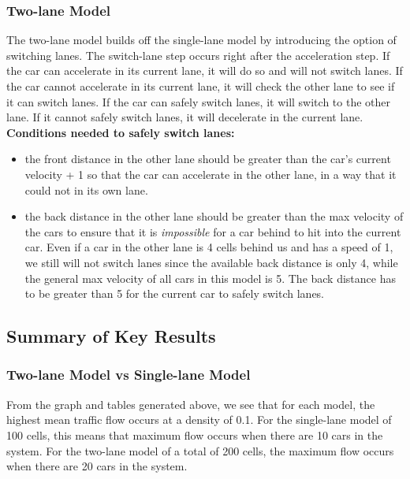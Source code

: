 \documentclass[11pt]{article}
\begin{document}
\subsubsection{Two-lane Model}

The two-lane model builds off the single-lane model by introducing the
option of switching lanes. The switch-lane step occurs right after the
acceleration step. If the car can accelerate in its current lane, it
will do so and will not switch lanes. If the car cannot accelerate in
its current lane, it will check the other lane to see if it can switch
lanes. If the car can safely switch lanes, it will switch to the other
lane. If it cannot safely switch lanes, it will decelerate in the
current lane.\\

\textbf{Conditions needed to safely switch lanes:}\\

\begin{itemize}
\item
  the front distance in the other lane should be greater than the car's
  current velocity + 1 so that the car can accelerate in the other lane,
  in a way that it could not in its own lane.
\item
  the back distance in the other lane should be greater than the max
  velocity of the cars to ensure that it is \emph{impossible} for a car
  behind to hit into the current car. Even if a car in the other lane is
  4 cells behind us and has a speed of 1, we still will not switch lanes
  since the available back distance is only 4, while the general max
  velocity of all cars in this model is 5. The back distance has to be
  greater than 5 for the current car to safely switch lanes.
\end{itemize}

    \subsection{Summary of Key Results}

\subsubsection{Two-lane Model vs Single-lane Model}

From the graph and tables generated above, we see that for each model,
the highest mean traffic flow occurs at a density of 0.1. For the
single-lane model of 100 cells, this means that maximum flow occurs when
there are 10 cars in the system. For the two-lane model of a total of
200 cells, the maximum flow occurs when there are 20 cars in the system.\\
\end{document}
